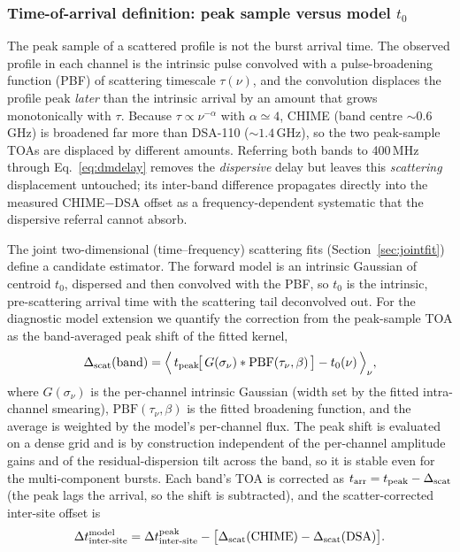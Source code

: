 \subsubsection{Time-of-arrival definition: peak sample versus model \texorpdfstring{$t_0$}{t0}}
\label{sec:toa-definition}

The peak sample of a scattered profile is not the burst arrival time. The
observed profile in each channel is the intrinsic pulse convolved with a
pulse-broadening function (PBF) of scattering timescale $\tau(\nu)$, and the
convolution displaces the profile peak \emph{later} than the intrinsic
arrival by an amount that grows monotonically with $\tau$. Because
$\tau\propto\nu^{-\alpha}$ with $\alpha\simeq4$, CHIME (band centre
$\sim0.6$\,GHz) is broadened far more than DSA-110 ($\sim1.4$\,GHz), so the two
peak-sample TOAs are displaced by different amounts. Referring both bands to
400\,MHz through Eq.~\eqref{eq:dmdelay} removes the \emph{dispersive} delay but
leaves this \emph{scattering} displacement untouched; its inter-band difference
propagates directly into the measured CHIME$-$DSA offset as a frequency-dependent
systematic that the dispersive referral cannot absorb.

The joint two-dimensional (time--frequency) scattering fits
(Section~\ref{sec:jointfit}) define a candidate estimator. The
forward model is an intrinsic Gaussian of centroid $t_0$, dispersed and then
convolved with the PBF, so $t_0$ is the intrinsic, pre-scattering arrival time
with the scattering tail deconvolved out. For the diagnostic model extension we
quantify the correction from the peak-sample TOA as the
band-averaged peak shift of the fitted kernel,
\begin{equation}
\Delta_{\rm scat}(\mathrm{band}) =
\Big\langle\, t_{\rm peak}\!\big[\,G(\sigma_\nu)\ast \mathrm{PBF}(\tau_\nu,\beta)\,\big]
- t_0(\nu) \,\Big\rangle_\nu ,
\label{eq:scatshift}
\end{equation}
where $G(\sigma_\nu)$ is the per-channel intrinsic Gaussian (width set by the
fitted intra-channel smearing), $\mathrm{PBF}(\tau_\nu,\beta)$ is the fitted
broadening function, and the average is weighted by the model's per-channel
flux. The peak shift is evaluated on a dense grid and is by construction
independent of the per-channel amplitude gains and of the residual-dispersion
tilt across the band, so it is stable even for the multi-component bursts. Each
band's TOA is corrected as $t_{\rm arr} = t_{\rm peak} - \Delta_{\rm scat}$
(the peak lags the arrival, so the shift is subtracted), and the scatter-corrected
inter-site offset is
\begin{equation}
\Delta t_{\rm inter\text{-}site}^{\rm model} =
\Delta t_{\rm inter\text{-}site}^{\rm peak}
- \big[\Delta_{\rm scat}(\mathrm{CHIME}) - \Delta_{\rm scat}(\mathrm{DSA})\big].
\label{eq:offsetcorr}
\end{equation}

